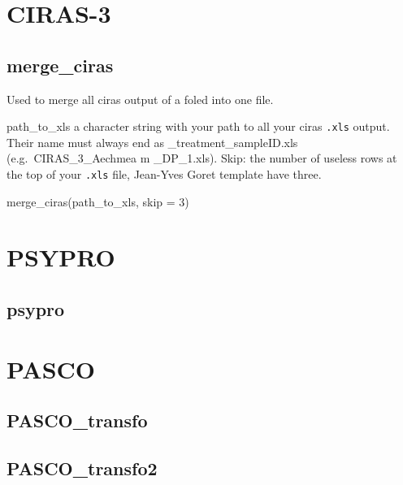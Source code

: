 \documentclass[
  12pt,
  american,
  a4paper,
  extrafontsizes,onecolumn,openright
  ]{memoir}
\newenvironment{Shaded}{\begin{snugshade}}{\end{snugshade}}
\newcommand{\AttributeTok}[1]{\textcolor[rgb]{0.77,0.63,0.00}{#1}}
\newcommand{\DecValTok}[1]{\textcolor[rgb]{0.00,0.00,0.81}{#1}}
\newcommand{\FunctionTok}[1]{\textcolor[rgb]{0.00,0.00,0.00}{#1}}
\newcommand{\NormalTok}[1]{#1}
\begin{document}
\normalsize

\hypertarget{ciras-3}{%
\section{CIRAS-3}\label{ciras-3}}

\hypertarget{merge_ciras}{%
\subsection{merge\_ciras}\label{merge_ciras}}

Used to merge all ciras output of a foled into one file.

path\_to\_xls a character string with your path to all your ciras \texttt{.xls} output.
Their name must always end as \_treatment\_sampleID.xls (e.g.~CIRAS\_3\_Aechmea m \_DP\_1.xls).
Skip: the number of useless rows at the top of your \texttt{.xls} file, Jean-Yves Goret template have three.

\scriptsize

\begin{Shaded}
\begin{Highlighting}[]
\FunctionTok{merge\_ciras}\NormalTok{(path\_to\_xls, }\AttributeTok{skip =} \DecValTok{3}\NormalTok{)}
\end{Highlighting}
\end{Shaded}

\normalsize

\hypertarget{psypro}{%
\section{PSYPRO}\label{psypro}}

\hypertarget{psypro-1}{%
\subsection{psypro}\label{psypro-1}}

\hypertarget{pasco}{%
\section{PASCO}\label{pasco}}

\hypertarget{pasco_transfo}{%
\subsection{PASCO\_transfo}\label{pasco_transfo}}

\hypertarget{pasco_transfo2}{%
\subsection{PASCO\_transfo2}\label{pasco_transfo2}}
\end{document}
